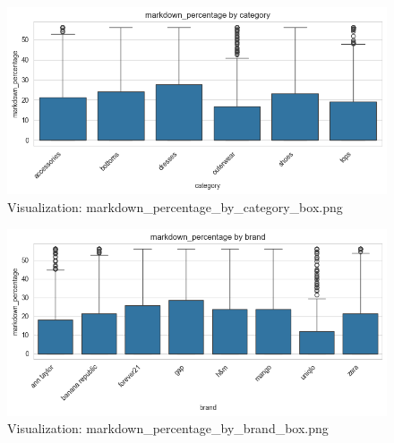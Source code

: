 \documentclass{article}%
\begin{document}
\begin{minipage}[c]{0.48\textwidth}%


\begin{figure}[H]%
\centering%
\includegraphics[width=\linewidth]{output/plots/markdown_percentage_by_category_box.png}%
\caption{Visualization: markdown\_percentage\_by\_category\_box.png}%
\end{figure}

%
\end{minipage}%
\begin{minipage}[c]{0.48\textwidth}%


\begin{figure}[H]%
\centering%
\includegraphics[width=\linewidth]{output/plots/markdown_percentage_by_brand_box.png}%
\caption{Visualization: markdown\_percentage\_by\_brand\_box.png}%
\end{figure}

%
\end{minipage}%
\vspace{10pt}%
\\%
\end{document}
